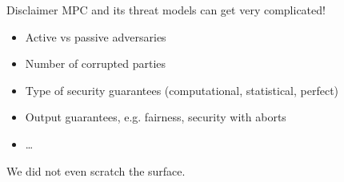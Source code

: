 \begin{frame}{Disclaimer}
  MPC and its threat models can get very complicated!
  \pause
  \begin{itemize}
    \item Active vs passive adversaries
    \item Number of corrupted parties
    \item Type of security guarantees (computational, statistical, perfect)
    \item Output guarantees, e.g. fairness, security with aborts
    \item \dots
  \end{itemize}

  \pause
  We did not even scratch the surface.
\end{frame}


